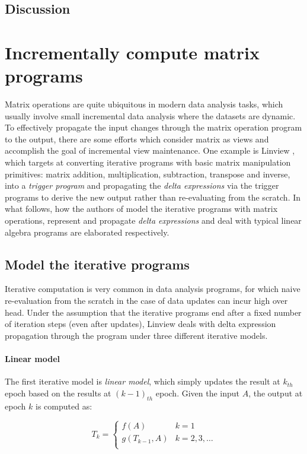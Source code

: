 \subsection{Discussion}


\section{Incrementally compute matrix programs}
Matrix operations are quite ubiquitous in modern data analysis tasks, which usually involve small incremental data analysis where the datasets are dynamic. To effectively propagate the input changes through the matrix operation program to the output, there are some efforts which consider matrix as views and accomplish the goal of incremental view maintenance. One example is Linview \cite{nikolic2014linview}, which targets at converting iterative programs with basic matrix manipulation primitives: matrix addition, multiplication, subtraction, transpose and inverse, into a {\em trigger program} and propagating the {\em delta expressions} via the trigger programs to derive the new output rather than re-evaluating from the scratch. In what follows, how the authors of \cite{nikolic2014linview} model the iterative programs with matrix operations, represent and propagate {\em delta expressions} and deal with typical linear algebra programs are elaborated respectively.

\subsection{Model the iterative programs}\label{sec: iterative_model}
Iterative computation is very common in data analysis programs, for which naive re-evaluation from the scratch in the case of data updates can incur high over head. Under the assumption that the iterative programs end after a fixed number of iteration steps (even after updates), Linview deals with delta expression propagation through the program under three different iterative models.

\paragraph{Linear model} The first iterative model is {\em linear model}, which simply updates the result at $k_{th}$ epoch based on the results at $(k-1)_{th}$ epoch. Given the input $A$, the output at epoch $k$ is computed as:

\[T_k=
\begin{cases}
f(A)& k=1\\
g(T_{k-1}, A) & k=2,3,\dots\\
\end{cases}
\]

